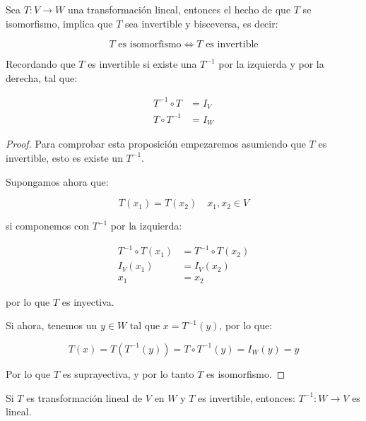 		\begin{proposicion}
			Sea $T \colon V \to W$ una transformación lineal, entonces el hecho de que $T$ se isomorfismo, implica que $T$ sea invertible y bisceversa, es decir:

			\begin{equation}
				T \text{ es isomorfismo} \iff T \text{ es invertible}
			\end{equation}

			Recordando que $T$ es invertible si existe una $T^{-1}$ por la izquierda y por la derecha, tal que:

			\begin{align}
				T^{-1} \circ T &= I_V \nonumber \\
				T \circ T^{-1} &= I_W
			\end{align}
		\end{proposicion}

		\begin{proof}
			Para comprobar esta proposición empezaremos asumiendo que $T$ es invertible, esto es existe un $T^{-1}$.

			Supongamos ahora que:

			\begin{equation}
				T(x_1) = T(x_2) \quad x_1, x_2 \in V
			\end{equation}

			si componemos con $T^{-1}$ por la izquierda:

			\begin{align*}
				T^{-1} \circ T(x_1) &= T^{-1} \circ T(x_2) \\
				I_V(x_1) &= I_V(x_2) \\
				x_1 &= x_2
			\end{align*}

			por lo que $T$ es inyectiva.

			Si ahora, tenemos un $y \in W$ tal que $x = T^{-1}(y)$, por lo que:

			\begin{equation*}
				T(x) = T(T^{-1}(y)) = T \circ T^{-1}(y) = I_W(y) = y
			\end{equation*}

			Por lo que $T$ es suprayectiva, y por lo tanto $T$ es isomorfismo.
		\end{proof}

		\begin{proposicion}
			Si $T$ es transformación lineal de $V$ en $W$ y $T$ es invertible, entonces: $T^{-1} \colon W \to V$ es lineal.
		\end{proposicion}

